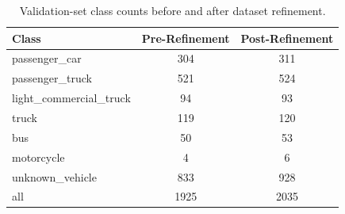 \begin{table}[!htbp]
    \centering
    \caption{Validation-set class counts before and after dataset refinement.}
    \label{tab:val-class-counts-refinement}
    \begin{tabular}{l c c}
        \toprule
        Class & Pre-Refinement & Post-Refinement \\
        \midrule
        passenger\_car            & 304  & 311  \\
        passenger\_truck          & 521  & 524  \\
        light\_commercial\_truck  & 94   & 93   \\
        truck                     & 119  & 120  \\
        bus                       & 50   & 53   \\
        motorcycle                & 4    & 6    \\
        unknown\_vehicle          & 833  & 928  \\
        \midrule
        all                       & 1925 & 2035 \\
        \bottomrule
    \end{tabular}
\end{table}
\FloatBarrier
%

